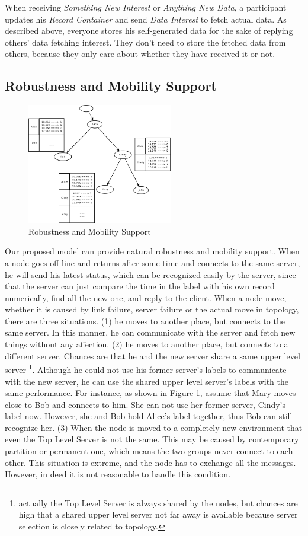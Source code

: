\documentclass[conference]{IEEEtran}
\begin{document}
When receiving \emph{Something New Interest} or \emph{Anything New Data},
a participant updates his \emph{Record Container} and send \emph{Data Interest} to fetch actual data.
As described above, everyone stores his self-generated data for the sake of replying others' data fetching interest.
They don't need to store the fetched data from others,
because they only care about whether they have received it or not.

\subsection{Robustness and Mobility Support}
\label{mobility}
\begin{figure}[!t]
\centering
\includegraphics[width=2.5in]{../png/mobility.png}
\caption{Robustness and Mobility Support}
\label{mobility_pic}
\end{figure}
Our proposed model can provide natural robustness and mobility support.
When a node goes off-line and returns after some time and connects to the same server,
he will send his latest status, which can be recognized easily by the server,
since that the server can just compare the time in the label with his own record numerically,
find all the new one, and reply to the client.
When a node move, whether it is caused by link failure,
server failure or the actual move in topology, there are three situations.
(1) he moves to another place, but connects to the same server.
In this manner, he can communicate with the server and fetch new things without any affection.
(2) he moves to another place, but connects to a different server.
Chances are that he and the new server share a same upper level server
\footnote{actually the Top Level Server is always shared by the nodes,
but chances are high that a shared upper level server not far away is available
because server selection is closely related to topology.}.
Although he could not use his former server's labels to communicate with the new server,
he can use the shared upper level server's labels with the same performance.
For instance, as shown in Figure \ref{mobility_pic},
assume that Mary moves close to Bob and connects to him.
She can not use her former server, Cindy's label now.
However, she and Bob hold Alice's label together, thus Bob can still recognize her.
(3) When the node is moved to a completely new environment that even the Top Level Server is not the same.
This may be caused by contemporary partition or permanent one,
which means the two groups never connect to each other. This situation is extreme,
and the node has to exchange all the messages.
However, in deed it is not reasonable to handle this condition.
\end{document}
